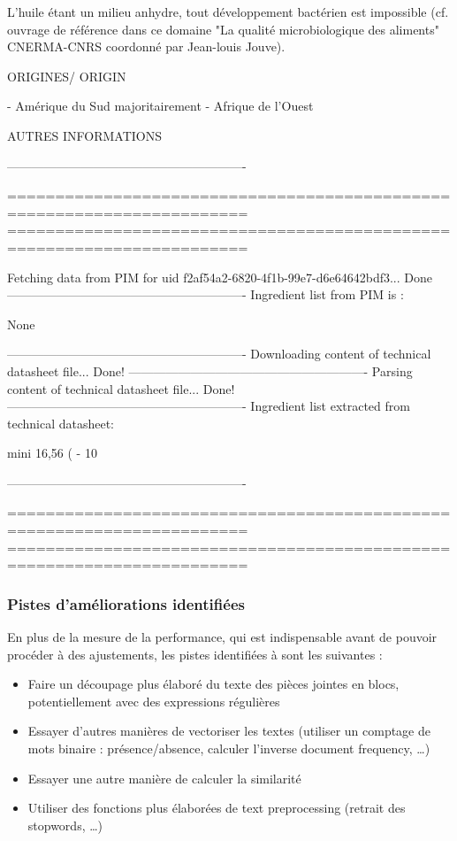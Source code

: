 \begin{spacing}{1.0}
{{\begin{spverbatim}
L’huile étant un milieu anhydre, tout développement bactérien est impossible (cf. ouvrage de 
référence  dans  ce  domaine  "La  qualité  microbiologique  des  aliments"  CNERMA-CNRS 
coordonné par Jean-louis Jouve). 
    
ORIGINES/ ORIGIN 
    
- Amérique du Sud majoritairement 
- Afrique de l’Ouest 
    
AUTRES INFORMATIONS 
    

----------------------------------------------------------

=======================================================================
=======================================================================

Fetching data from PIM for uid f2af54a2-6820-4f1b-99e7-d6e64642bdf3...
Done
----------------------------------------------------------
Ingredient list from PIM is :

None

----------------------------------------------------------
Downloading content of technical datasheet file...
Done!
----------------------------------------------------------
Parsing content of technical datasheet file...
Done!
----------------------------------------------------------
Ingredient list extracted from technical datasheet:

mini 16,56 ( - 10 %

----------------------------------------------------------

=======================================================================
=======================================================================  
                \end{spverbatim}
                }
                }
                \end{spacing}

            \subsubsection{Pistes d'améliorations identifiées}

            En plus de la mesure de la performance, qui est indispensable avant de pouvoir procéder à des ajustements, les pistes identifiées à sont les suivantes :
            \begin{itemize}
                \item Faire un découpage plus élaboré du texte des pièces jointes en blocs, potentiellement avec des expressions régulières
                \item Essayer d'autres manières de vectoriser les textes (utiliser un comptage de mots binaire : présence/absence, calculer l'inverse document frequency, \dots)
                \item Essayer une autre manière de calculer la similarité
                \item Utiliser des fonctions plus élaborées de text preprocessing (retrait des stopwords, \dots)
            \end{itemize}

